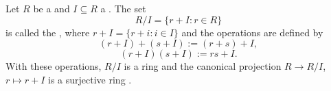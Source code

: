 \begin{definition} \label{definition:quotient_ring_of_a_ring_by_a_two_sided_ideal}
Let $R$ be a  and $I \subseteq R$ a . The set
$$R/I = \{ r + I : r \in R\}$$
is called the , where $r+I = \{r+i : i \in I\}$ and the operations are defined by
$$(r+I) + (s+I) := (r+s) + I,$$
$$(r+I)(s+I) := rs + I.$$
With these operations, $R/I$ is a ring and the canonical projection $R \to R/I$, $r \mapsto r+I$ is a surjective ring .
\end{definition}
